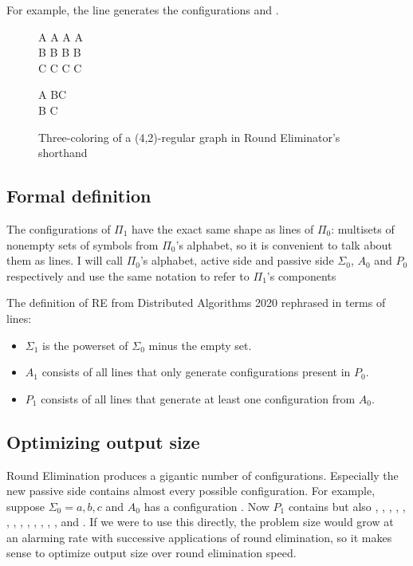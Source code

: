 \documentclass[english, 12pt, a4paper, sci, utf8, a-1b, online]{aaltothesis}
\begin{document}
For example, the line  generates the configurations  and .

\begin{figure}[h]
  \centering
  \begin{tcolorbox}[width=.2\textwidth, nobeforeafter, title=active side]
  A A A A \\
  B B B B \\
  C C C C
  \end{tcolorbox}
  \begin{tcolorbox}[width=.2\textwidth, nobeforeafter, title=passive side]
  A BC \\
  B C
  \end{tcolorbox}
  \caption{Three-coloring of a (4,2)-regular graph in Round Eliminator's shorthand}
\end{figure}

\subsection{Formal definition}
The configurations of $\Pi_1$ have the exact same shape as lines of $\Pi_0$: multisets of nonempty sets of symbols from $\Pi_0$'s alphabet, so it is convenient to talk about them as lines. I will call $\Pi_0$'s alphabet, active side and passive side $\Sigma_0$, $A_0$ and $P_{0}$ respectively and use the same notation to refer to $\Pi_{1}$'s components

The definition of RE from Distributed Algorithms 2020\cite{DA2020} rephrased in terms of lines:
\begin{itemize}
  \item $\Sigma_1$ is the powerset of $\Sigma_0$ minus the empty set.
  \item $A_{1}$ consists of all lines that only generate configurations present in $P_{0}$.
  \item $P_1$ consists of all lines that generate at least one configuration from $A_0$.
\end{itemize}

\subsection{Optimizing output size}

Round Elimination produces a gigantic number of configurations. Especially the new passive side contains almost every possible configuration. For example, suppose $\Sigma_{0} = {a, b, c}$ and $A_0$ has a configuration . Now $P_{1}$ contains  but also , , , , , , , , , , , , ,  and . If we were to use this directly, the problem size would grow at an alarming rate with successive applications of round elimination, so it makes sense to optimize output size over round elimination speed.
\end{document}
